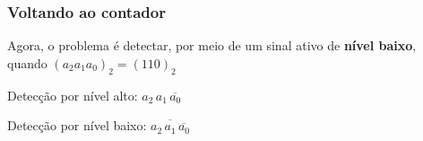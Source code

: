 \documentclass{beamer}
\newcommand{\Not}[1]{\overline{#1}}
\begin{document}
\begin{frame}
\frametitle{Voltando ao contador}

Agora, o problema é detectar, por meio de um sinal
ativo de \textbf{nível baixo}, quando $(a_2 a_1 a_0)_2 = (110)_2$

\pause

\vspace{12pt}

Detecção por nível alto: $a_2 \, a_1 \, \Not{a_0}$

\pause

\vspace{6pt}

Detecção por nível baixo: $\Not{a_2 \, a_1 \, \Not{a_0}}$

\pause

\vspace{6pt}

%
%

\end{frame}
\end{document}
